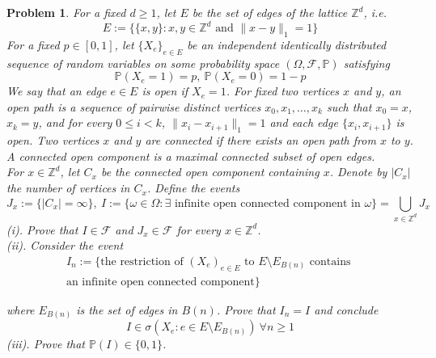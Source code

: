 \documentclass[12pt]{article}
\newtheorem{problem}{Problem}
\begin{document}
\begin{problem}
    For a fixed $d\geq 1$, let $E$ be the set of edges of the lattice $\mathbb{Z}^d$, i.e. 
    $$
        E:= \{\{x,y\}:x,y\in\mathbb{Z}^d\text{ and } \|x-y\|_1=1\}
    $$
    For a fixed $p\in [0,1]$, let $\{X_e\}_{e\in E}$ be an independent identically distributed sequence of random variables on some probability space $(\Omega, \mathcal{F}, \mathbb{P})$ satisfying
    $$
        \mathbb{P}(X_e=1)=p, \ \mathbb{P}(X_e=0)=1-p
    $$
    We say that an edge $e\in E$ is open if $X_e=1$. For fixed two vertices $x$ and $y$, an open path is a sequence of pairwise distinct vertices $x_0, x_1, \dots, x_k$ such that $x_0=x$, $x_k=y$, and for every $0\leq i<k$, $\|x_i-x_{i+1}\|_1=1$ and each edge $\{x_i, x_{i+1}\}$ is open. Two vertices $x$ and $y$ are connected if there exists an open path from $x$ to $y$. A connected open component is a maximal connected subset of open edges. \\
    \indent For $x\in\mathbb{Z}^d$, let $C_x$ be the connected open component containing $x$. Denote by $|C_x|$ the number of vertices in $C_x$. Define the events
    $$
        J_x:=\{|C_x|=\infty\}, \ I:=\{\omega\in\Omega:\exists\text{ infinite open connected component in }\omega\}=\bigcup_{x\in\mathbb{Z}^d}J_x
    $$
    \indent (i). Prove that $I\in\mathcal{F}$ and $J_x\in\mathcal{F}$ for every $x\in\mathbb{Z}^d$. \\
    \indent (ii). Consider the event 
    \begin{align*}
        I_n:=\{\text{the restriction of }(X_e)_{e\in E}\text{ to }E\setminus E_{B(n)}\text{ contains } \\ \text{an infinite open connected component}\}
    \end{align*}
        
    where $E_{B(n)}$ is the set of edges in $B(n)$. Prove that $I_n=I$ and conclude 
    $$
        I\in\sigma(X_e: e\in E\setminus E_{B(n)}) \ \forall n\geq 1
    $$
    \indent (iii). Prove that $\mathbb{P}(I)\in\{0,1\}$.
\end{problem}
\end{document}
